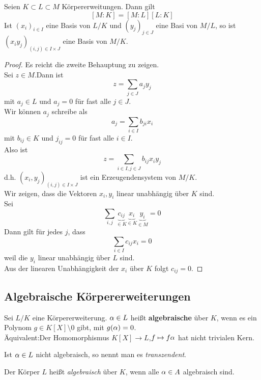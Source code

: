 	\begin{theorem}[Gradsatz]
		Seien $K\subset L\subset M$ Körpererweitungen. Dann gilt
		\[[M:K]=[M:L][L:K]\]
		Ist $(x_i)_{i\in I}$ eine Basis von $L/K$ und $(y_j)_{j\in J}$ eine Basi von $M/L$, so ist $(x_iy_j)_{(i,j)\in I\times J}$ eine Basis von $M/K$.
	\end{theorem}
	\begin{proof}
		Es reicht die zweite Behauptung zu zeigen.\\
		Sei $z\in M$.Dann ist
		\[z=\sum_{j\in J}a_jy_j\]
		mit $a_j\in L$ und $a_j=0$ für fast alle $j\in J$.\\
		Wir können $a_j$ schreibe als
		\[a_j=\sum_{i\in I}b_{ji}x_i\]
		mit $b_{ij}\in K$ und $j_{ij}=0$ für fast alle $i\in I$.\\
		Also ist
		\[z=\sum_{i\in I,j\in J}b_{ij}x_iy_j\]
		d.h. $(x_i,y_j)_{(i,j)\in I\times J}$ ist ein Erzeugendensystem von $M/K$.\\
		Wir zeigen, dass die Vektoren $x_i,y_i$ linear unabhängig über $K$ sind.\\
		Sei
		\[\sum_{i,j}\underbrace{c_{ij}}_{\in K}\underbrace{x_i}_{\in K}\underbrace{y_i}_{\in M}=0\]
		Dann gilt für jedes $j$, dass
		\[\sum_{i\in I}c_{ij}x_i=0\]
		weil die $y_i$ linear unabhängig über $L$ sind.\\
		Aus der linearen Unabhängigkeit der $x_i$ über $K$ folgt $c_{ij}=0$.
	\end{proof}

	\subsection{Algebraische Körpererweiterungen}
	\begin{definition}
		Sei $L/K$ eine Körpererweiterung. $\alpha\in L$ heißt \textbf{algebraische} über $K$, wenn es ein Polynom $g\in K[X]\setminus 0$ gibt, mit $g(\alpha)=0$.\\
		Äquivalent:Der Homomorphismus $K[X]\to L$,$f\mapsto f\alpha$ hat nicht trivialen Kern.
	\end{definition}


	\begin{definition}
		Ist $\alpha\in L$ nicht algebraisch, so nennt man es \emph{transzendent}.
	\end{definition}

	\begin{definition}
		Der Körper $L$ heißt \emph{algebraisch} über $K$, wenn alle $\alpha\in A$ algebraisch sind.
	\end{definition}

